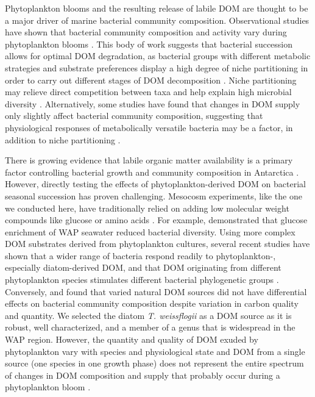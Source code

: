 Phytoplankton blooms and the resulting release of labile DOM are thought to be a major driver of marine bacterial community composition. Observational studies have shown that bacterial community composition and activity vary during phytoplankton blooms \citep{pinhassi2000seasonal,fandino2001variation,West2008-vp,tada2011differing,Teeling2012-jz,Klindworth2014-ba,wemheuer2015green}. This body of work suggests that bacterial succession allows for optimal DOM degradation, as bacterial groups with different metabolic strategies and substrate preferences display a high degree of niche partitioning in order to carry out different stages of DOM decomposition \citep{cottrell2000natural,alonso2007seasonal,poretsky2010transporter,rinta2012bacterial,sarmento2012use,Teeling2012-jz}. Niche partitioning may relieve direct competition between taxa and help explain high microbial diversity \citep{Teeling2012-jz,hutchinson1957concluding}. Alternatively, some studies have found that changes in DOM supply only slightly affect bacterial community composition, suggesting that physiological responses of metabolically versatile bacteria may be a factor, in addition to niche partitioning \citep{kirchman2004changes,rooney2005links,rink2007effects}.

There is growing evidence that labile organic matter availability is a primary factor controlling bacterial growth and community composition in Antarctica \citep{thingstad1991bacteria,Kirchman2009-sg,dsvse12,Kim2014-oj,luria2016seasonal}. However, directly testing the effects of phytoplankton-derived DOM on bacterial seasonal succession has proven challenging. Mesocosm experiments, like the one we conducted here, have traditionally relied on adding low molecular weight compounds like glucose or amino acids \citep{havskum2003silicate,allers2007response,gomez2012structuring}. For example, \citet{dmegm11} demonstrated that glucose enrichment of WAP seawater reduced bacterial diversity. Using more complex DOM substrates derived from phytoplankton cultures, several recent studies have shown that a wider range of bacteria respond readily to phytoplankton-, especially diatom-derived DOM, and that DOM originating from different phytoplankton species stimulates different bacterial phylogenetic groups \citep{sarmento2012use,nelson2012tracking,romera2011net}. Conversely, \citet{Landa2014-yg} and \citet{sharma2014distinct} found that varied natural DOM sources did not have differential effects on bacterial community composition despite variation in carbon quality and quantity. We selected the diatom \emph{T. weissflogii} as a DOM source as it is robust, well characterized, and a member of a genus that is widespread in the WAP region. However, the quantity and quality of DOM exuded by phytoplankton vary with species and physiological state and DOM from a single source (one species in one growth phase) does not represent the entire spectrum of changes in DOM composition and supply that probably occur during a phytoplankton bloom \citep{becker2014closely,Landa2014-yg}. 

